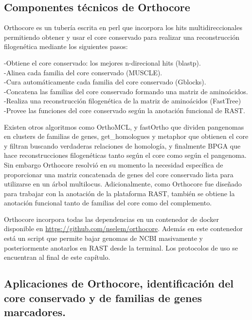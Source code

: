 \documentclass[12pt,twoside]{reedthesis}
\begin{document}
  \subsection{Componentes técnicos de
  Orthocore}\label{componentes-tecnicos-de-orthocore}
  
  Orthocore es un tubería escrita en perl que incorpora los hits
  multidireccionales permitiendo obtener y usar el core conservado para
  realizar una reconstrucción filogenética mediante los siguientes pasos:
  
  -Obtiene el core conservado: los mejores n-direcional hits (blastp).\\
  -Alinea cada familia del core conservado (MUSCLE).\\
  -Cura automáticamente cada familia del core conservado (Gblocks).\\
  -Concatena las familias del core conservado formando una matriz de
  aminoácidos.\\
  -Realiza una reconstrucción filogenética de la matriz de aminoácidos
  (FastTree)\\
  -Provee las funciones del core conservado según la anotación funcional
  de RAST.
  
  Existen otros algoritmos como OrthoMCL, y fastOrtho que dividen
  pangenomas en clusters de familias de genes, get\_homologues y metaphor
  que obtienen el core y filtran buscando verdaderas relaciones de
  homología, y finalmente BPGA que hace reconstrucciones filogenéticas
  tanto según el core como según el pangenoma. Sin embargo Orthocore
  resolvió en su momento la necesidad específica de proporcionar una
  matriz concatenada de genes del core conservado lista para utilizarse en
  un árbol multilocus. Adicionalmente, como Orthocore fue diseñado para
  trabajar con la anotación de la plataforma RAST, también se obtiene la
  anotación funcional tanto de familias del core como del complemento.
  
  Orthocore incorpora todas las dependencias en un contenedor de docker
  disponible en \url{https://github.com/nselem/orthocore}. Además en este
  contenedor está un script que permite bajar genomas de NCBI masivamente
  y posteriormente anotarlos en RAST desde la terminal. Los protocolos de
  uso se encuentran al final de este capítulo.
  
  \subsection{Aplicaciones de Orthocore, identificación del core
  conservado y de familias de genes
  marcadores.}\label{aplicaciones-de-orthocore-identificacion-del-core-conservado-y-de-familias-de-genes-marcadores.}
  
\end{document}
